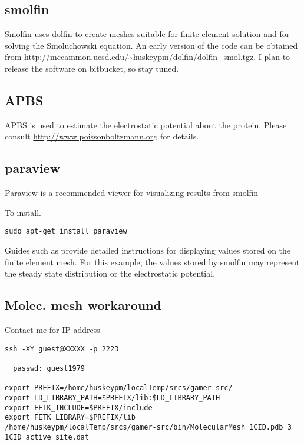 \documentclass{article}
\begin{document}
\subsection{smolfin}
Smolfin uses dolfin to create meshes suitable for finite element solution and for solving the Smoluchowski equation. 
An early version of the code can be obtained from
\url{http://mccammon.ucsd.edu/~huskeypm/dolfin/dolfin_smol.tgz}. I plan to release the software on bitbucket, so stay tuned.

\subsection{APBS}
APBS is used to estimate the electrostatic potential about the protein. Please consult \url{http://www.poissonboltzmann.org} for details. 

\subsection{paraview}
Paraview is a recommended viewer for visualizing results from smolfin

To install. 
\begin{verbatim}
sudo apt-get install paraview 
\end{verbatim}

Guides such as  provide detailed instructions for displaying values stored on the finite element mesh. For this example, the values stored by smolfin may represent the  steady state distribution or the electrostatic potential. 

\subsection{Molec. mesh workaround}
\label{sec:broke}

Contact me for IP address
\begin{verbatim}
ssh -XY guest@XXXXX -p 2223

  passwd: guest1979

export PREFIX=/home/huskeypm/localTemp/srcs/gamer-src/
export LD_LIBRARY_PATH=$PREFIX/lib:$LD_LIBRARY_PATH
export FETK_INCLUDE=$PREFIX/include
export FETK_LIBRARY=$PREFIX/lib
/home/huskeypm/localTemp/srcs/gamer-src/bin/MolecularMesh 1CID.pdb 3 1CID_active_site.dat
\end{verbatim}
\end{document}
